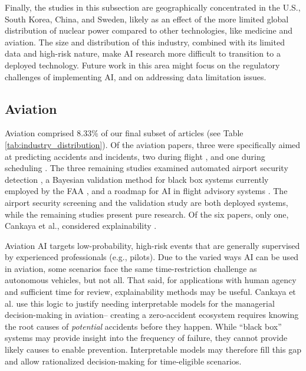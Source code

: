 \documentclass[authoryear,preprint,12pt]{elsarticle}
\begin{document}
Finally, the studies in this subsection are geographically concentrated in the
U.S., South Korea, China, and Sweden, likely as an effect of the more limited
global distribution of nuclear power compared to other technologies, like
medicine and aviation. The size and distribution of this industry, combined with
its limited data and high-risk nature, make AI research more difficult to
transition to a deployed technology. Future work in this area might focus on the
regulatory challenges of implementing AI, and on addressing data limitation
issues.

\subsection{Aviation}
\label{sec:aviation}
Aviation comprised 8.33\% of our final subset of articles (see Table
\ref{tab:industry_distribution}). Of the aviation papers, three were
specifically aimed at predicting accidents and incidents, two during flight
\cite{khattakMultimodalLSTMNetwork2024, kongBayesianDeepLearning2022},
and one during scheduling
\cite{cankayaEvidencebasedManagerialDecisionmaking2023}. The three remaining
studies examined automated airport security detection
\cite{huegliEffectsFalseAlarms2025}, a Bayesian validation method for black box
systems currently employed by the FAA \cite{mossBayesianSafetyValidation2024},
and a roadmap for AI in flight advisory systems
\cite{ramosNeedConceptualDesign2023}. The airport security screening and the
validation study are both deployed systems, while the remaining studies present
pure research. Of the six papers, only one, Cankaya et al., considered
explainability \cite{cankayaEvidencebasedManagerialDecisionmaking2023}. 

Aviation AI targets low-probability, high-risk events that are generally
supervised by experienced professionals (e.g., pilots). Due to the varied ways
AI can be used in aviation, some scenarios face the same time-restriction
challenge as autonomous vehicles, but not all. That said, for applications with
human agency and sufficient time for review, explainability methods may be
useful. Cankaya et al. \cite{cankayaEvidencebasedManagerialDecisionmaking2023}
use this logic to justify needing interpretable models for the managerial
decision-making in aviation-- creating a zero-accident ecosystem requires
knowing the root causes of \textit{potential} accidents before they happen.
While ``black box'' systems may provide insight into the frequency of failure,
they cannot provide likely causes to enable prevention. Interpretable models may
therefore fill this gap and allow rationalized decision-making for time-eligible
scenarios. 
\end{document}
